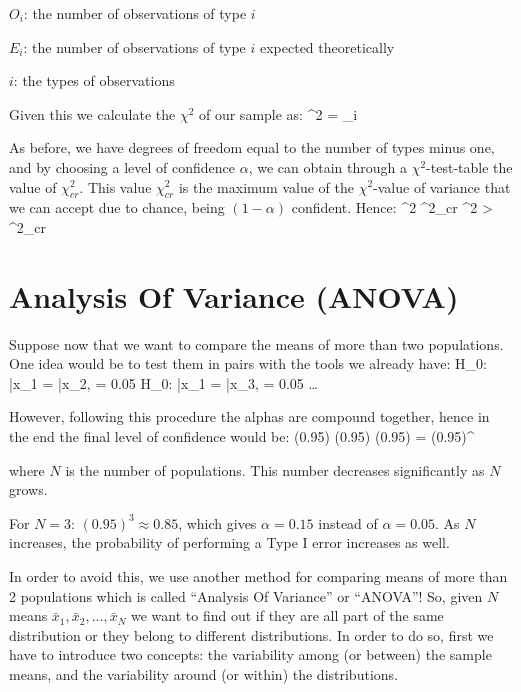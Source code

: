 \bit
\item $O_{i}$: the number of observations of type $i$
\item $E_{i}$: the number of observations of type $i$ expected theoretically
\item $i$: the types of observations
\eit

Given this we calculate the $\chi^{2}$ of our sample as:
\bse
\chi^{2} = \sum_{i} 
\ese

As before, we have degrees of freedom equal to the number of types minus one, and by choosing a level of confidence
$\alpha$, we can obtain through a $\chi^{2}$-test-table the value of $\chi^{2}_{cr}$. This value $\chi^{2}_{cr}$ is
the maximum value of the $\chi^{2}$-value of variance that we can accept due to chance, being $(1 - \alpha)$
confident. Hence:
\bse
\chi^{2} \leq \chi^{2}_{cr} \imp {} \qquad \qquad
\chi^{2} > \chi^{2}_{cr} \imp {}
\ese

\section{Analysis Of Variance (ANOVA)}

Suppose now that we want to compare the means of more than two populations. One idea would be to test them in
pairs with the tools we already have:
\bse
H_{0}: \bar{x}_{1} = \bar{x}_{2}, \:\: \alpha = 0.05 \qquad
H_{0}: \bar{x}_{1} = \bar{x}_{3}, \:\: \alpha = 0.05 \qquad \ldots
\ese

However, following this procedure the alphas are compound together, hence in the end the final level of confidence
would be:
\bse
(0.95) \cdot (0.95) \cdots (0.95) = (0.95)^{}
\ese

where $N$ is the number of populations. This number decreases significantly as $N$ grows.

\be
For $N = 3$: $(0.95)^{3} \approx 0.85$, which gives $\alpha = 0.15$ instead of $\alpha = 0.05$. As $N$ increases,
the probability of performing a Type I error increases as well.
\ee

In order to avoid this, we use another method for comparing means of more than 2 populations which is called
``Analysis Of Variance'' or ``ANOVA''! So, given $N$ means $\bar{x}_{1}, \bar{x}_{2}, \ldots, \bar{x}_{N}$ we want to
find out if they are all part of the same distribution or they belong to different distributions. In order to do so,
first we have to introduce two concepts: the variability among (or between) the sample means, and the variability
around (or within) the distributions.


